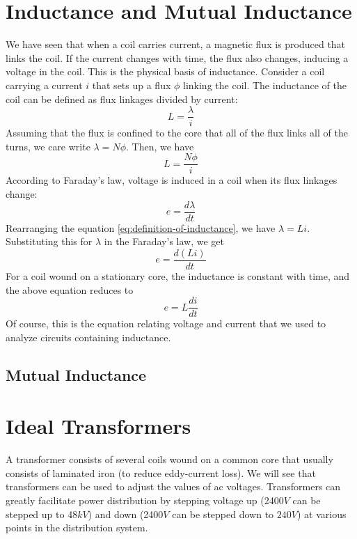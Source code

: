 \documentclass[math,code]{amznotes}
\theoremstyle{remark}
\begin{document}
\section{Inductance and Mutual Inductance}
We have seen that when a coil carries current, a magnetic flux is produced that links the coil. If the current changes with time, the flux also changes, inducing a voltage in the coil. This is the physical basis of inductance. \newline
Consider a coil carrying a current $i$ that sets up a flux $\phi$ linking the coil. The inductance of the coil can be defined as flux linkages divided by current:
\begin{equation} \label{eq:definition-of-inductance}
    L=\frac{\lambda}{i}
\end{equation}
Assuming that the flux is confined to the core that all of the flux links all of the turns, we care write $\lambda =N\phi$. Then, we have
\begin{equation}
    L=\frac{N\phi}{i}
\end{equation}
According to Faraday's law, voltage is induced in a coil when its flux linkages change:
\begin{displaymath}
    e=\frac{d\lambda}{dt}
\end{displaymath}
Rearranging the equation \eqref{eq:definition-of-inductance}, we have $\lambda = Li$. Substituting this for $\lambda$ in the Faraday's law, we get
\begin{equation}
    e=\frac{d(Li)}{dt}
\end{equation}
For a coil wound on a stationary core, the inductance is constant with time, and the above equation reduces to
\begin{equation}
    e=L\frac{di}{dt}
\end{equation}
Of course, this is the equation relating voltage and current that we used to analyze circuits containing inductance.
\subsection{Mutual Inductance}
\section{Ideal Transformers}
A transformer consists of several coils wound on a common core that usually consists of laminated iron (to reduce eddy-current loss). We will see that transformers can be used to adjust the values of ac voltages. Transformers can greatly facilitate power distribution by stepping voltage up (2400$V$ can be stepped up to 48$kV$) and down (2400$V$ can be stepped down to $240V$) at various points in the distribution system.
\end{document}
